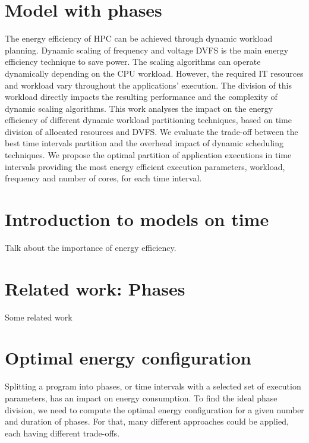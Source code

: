 
\section{Model with phases} \label{sec:model_with_phases}

The energy efficiency of HPC can be achieved through dynamic workload planning. Dynamic scaling of frequency and voltage DVFS is the main energy efficiency technique to save power. The scaling algorithms can operate dynamically depending on the CPU workload. However, the required IT resources and workload vary throughout the applications' execution. The division of this workload directly impacts the resulting performance and the complexity of dynamic scaling algorithms. This work analyses the impact on the energy efficiency of different dynamic workload partitioning techniques, based on time division of allocated resources and DVFS. We evaluate the trade-off between the best time intervals partition and the overhead impact of dynamic scheduling techniques. We propose the optimal partition of application executions in time intervals providing the most energy efficient execution parameters, workload, frequency and number of cores, for each time interval.

\section{Introduction to models on time} \label{sec:introduction_to_models_on_time}
Talk about the importance of energy efficiency.

\section{Related work: Phases} \label{sec:related_work_phases}
Some related work

\section{Optimal energy configuration} \label{sec:Optimal_energy_configuration}
Splitting a program into phases, or time intervals with a selected set of execution parameters, has an impact on energy consumption. To find the ideal phase division, we need to compute the optimal energy configuration for a given number and duration of phases. For that, many different approaches could be applied, each having different trade-offs. 

